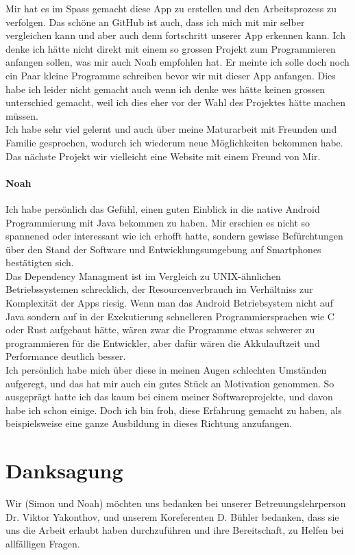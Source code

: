 \documentclass[a4paper,11pt]{article}
\begin{document}
Mir hat es im Spass gemacht diese App zu erstellen und den Arbeitsprozess zu verfolgen. Das schöne an GitHub ist auch, dass ich mich mit mir selber vergleichen kann und aber auch denn 
fortschritt unserer App erkennen kann. Ich denke ich hätte nicht direkt mit einem so grossen Projekt zum Programmieren anfangen sollen, was mir auch Noah empfohlen hat. Er meinte ich solle 
doch noch ein Paar kleine Programme schreiben bevor wir mit dieser App anfangen. Dies habe ich leider nicht gemacht auch wenn ich denke wes hätte keinen grossen unterschied gemacht,
weil ich dies eher vor der Wahl des Projektes hätte machen müssen. \\

Ich habe sehr viel gelernt und auch über meine Maturarbeit mit Freunden und Familie gesprochen, wodurch ich wiederum neue Möglichkeiten bekommen habe. Das nächste Projekt wir vielleicht eine 
Website mit einem Freund von Mir.


\paragraph{Noah}
Ich habe persönlich das Gefühl, einen guten Einblick in die native Android Programmierung mit Java bekommen zu haben. Mir erschien es nicht so spannened oder interessant wie ich erhofft hatte, sondern gewisse Befürchtungen über den Stand der Software und Entwicklungsumgebung auf Smartphones bestätigten sich.\\

Das Dependency Managment ist im Vergleich zu UNIX-ähnlichen Betriebssystemen schrecklich, der Resourcenverbrauch im Verhältniss zur Komplexität der Apps riesig. Wenn man das Android Betriebsystem nicht auf Java sondern auf in der Exekutierung schnelleren Programmiersprachen wie C oder Rust aufgebaut hätte, wären zwar die Programme etwas schwerer zu programmieren für die Entwickler, aber dafür wären die Akkulauftzeit und Performance deutlich besser.\\

Ich persönlich habe mich über diese in meinen Augen schlechten Umständen aufgeregt, und das hat mir auch ein gutes Stück an Motivation genommen. So ausgeprägt hatte ich das kaum bei einem meiner Softwareprojekte, und davon habe ich schon einige. Doch ich bin froh, diese Erfahrung gemacht zu haben, als beispielsweise eine ganze Ausbildung in dieses Richtung anzufangen.

\section{Danksagung}
Wir (Simon und Noah) möchten uns bedanken bei unserer Betreuungslehrperson Dr. Viktor Yakonthov, und unserem Koreferenten D. Bühler bedanken, dass sie uns die Arbeit erlaubt haben durchzuführen und ihre Bereitschaft, zu Helfen bei allfälligen Fragen.
\end{document}
